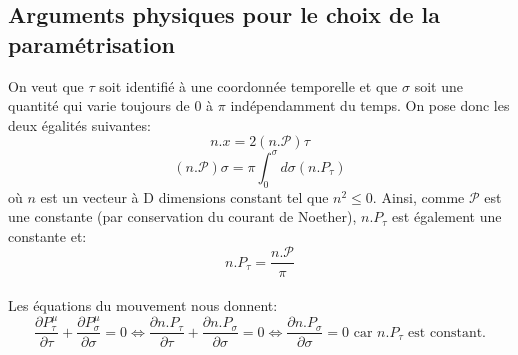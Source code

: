 \documentclass[a4paper,12pt]{article}
\def\CP{\mathcal{P}}
\begin{document}
\subsection{Arguments physiques pour le choix de la paramétrisation}
On veut que $\tau$ soit identifié à une coordonnée temporelle et que $\sigma$ soit une quantité qui varie toujours de $0$ à $\pi$ indépendamment du temps.
On pose donc les deux égalités suivantes:
$$n.x=2(n.\mathcal{P})\tau$$
$$(n.\mathcal{P})\sigma=\pi\int_0^\sigma d\sigma (n.P_\tau)$$
où $n$ est un vecteur à D dimensions constant tel que $n^2\leq0$.
Ainsi, comme $\CP$ est une constante (par conservation du courant de Noether), 
$n.P_\tau$ est également une constante et:
$$n.P_\tau=\frac{n.\mathcal{P}}{\pi}$$\\
Les équations du mouvement nous donnent:
\begin{equation*}
\frac{\partial P^{\mu}_{\tau}}{\partial \tau}+\frac{\partial P^{\mu}_{\sigma}}{\partial \sigma}=0 \Leftrightarrow \frac{\partial n.P_{\tau}}{\partial \tau}+\frac{\partial n.P_{\sigma}}{\partial \sigma}=0 \Leftrightarrow \frac{\partial n.P_{\sigma}}{\partial \sigma}=0 \mbox{ car } n.P_\tau \mbox{ est constant.}
\end{equation*}
\end{document}

